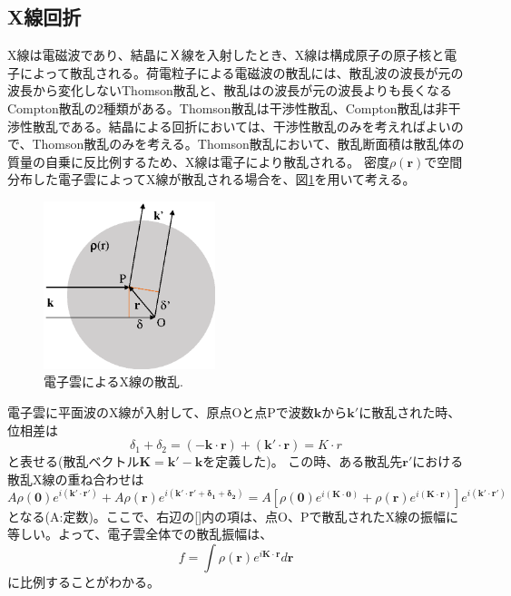 \documentclass[11pt,a4j,uplatex]{jsarticle}
\begin{document}
\newpage
\subsection{X線回折}%
X線は電磁波であり、結晶にＸ線を入射したとき、X線は構成原子の原子核と電子によって散乱される。荷電粒子による電磁波の散乱には、散乱波の波長が元の波長から変化しないThomson散乱と、散乱はの波長が元の波長よりも長くなるCompton散乱の2種類がある。Thomson散乱は干渉性散乱、Compton散乱は非干渉性散乱である。結晶による回折においては、干渉性散乱のみを考えればよいので、Thomson散乱のみを考える。Thomson散乱において、散乱断面積は散乱体の質量の自乗に反比例するため、X線は電子により散乱される。
密度$\rho(\bm{r})$で空間分布した電子雲によってX線が散乱される場合を、図\ref{sanran}を用いて考える。
\begin{figure}[htb]
 \centering
 \includegraphics[clip,width=5cm]{sanran.eps}
 \caption{電子雲によるX線の散乱.}
 \label{sanran}
\end{figure}

電子雲に平面波のX線が入射して、原点Oと点Pで波数$\bm{k}$から$\bm{k}'$に散乱された時、位相差は
\begin{equation}
  \delta_1+\delta_2=\bm{(-k\cdot r)+(k'\cdot r)}=K\cdot r
\end{equation}
と表せる(散乱ベクトル$\bm{K=k'-k}$を定義した)。
この時、ある散乱先$\bm{r'}$における散乱X線の重ね合わせは
\begin{equation}
  A\rho\bm{(0)}e^{i(\bm{k'\cdot r'})}+  A\rho\bm{(r)}e^{i(\bm{k'\cdot r'+\delta_1+\delta_2})}=A[\rho\bm{(0)}e^{i(\bm{K\cdot 0})}+\rho\bm{(r)}e^{i(\bm{K\cdot r})}]e^{i(\bm{k'\cdot r'})}
\end{equation}
となる(A:定数)。ここで、右辺の[]内の項は、点O、Pで散乱されたX線の振幅に等しい。よって、電子雲全体での散乱振幅は、
\begin{equation}
  f=\int\rho(\bm{r})e^{i\bm{K\cdot r}}d\bm{r}
  \label{insi}
\end{equation}
に比例することがわかる。
\end{document}
